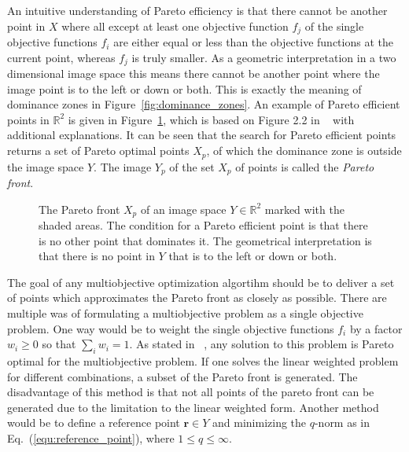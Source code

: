 \documentclass[a4paper,10pt]{article}
\renewcommand{\vec}[1]{\mathbf{#1}}
\newcommand{\equref}[1]{Eq.~(\ref{#1})}
\newcommand{\figref}[1]{Figure~\ref{#1}}
\begin{document}
    An intuitive understanding of Pareto efficiency is that there cannot be another
    point in $X$ where all except at least one objective function $f_j$ of the single objective
    functions $f_i$ are either equal or less than the objective functions at the current point,
    whereas $f_j$ is truly smaller.
    As a geometric interpretation in a two dimensional image space this means
    there cannot be another point where the image point is to the left or down or both.
    This is exactly the meaning of dominance zones in \figref{fig:dominance_zones}.
    An example of Pareto efficient points in $\mathbb{R}^2$ is given in \figref{fig:pareto_front},
    which is based on Figure 2.2 in ~\cite{multiobjective} with additional explanations.
    It can be seen that the search for Pareto efficient points returns a
    set of Pareto optimal points $X_p$, of which the dominance zone is outside the
    image space $Y$.
    The image $Y_p$ of the set $X_p$ of points is called the \emph{Pareto front}.
    
    \begin{figure}
        \centering
        \caption[Pareto front]{The Pareto front $X_p$ of an image space $Y \in \mathbb{R}^2$
        marked with the shaded areas.
        The condition for a Pareto efficient point is that there is no other
        point that dominates it.
        The geometrical interpretation is that there is no point in $Y$ that
        is to the left or down or both.}
        \label{fig:pareto_front}
    \end{figure}
    
    The goal of any multiobjective optimization algortihm should be to deliver
    a set of points which approximates the Pareto front as closely as possible.
    There are multiple was of formulating a multiobjective problem as
    a single objective problem.
    One way would be to weight the single objective functions $f_i$ by a factor
    $w_i \geq 0$ so that $\sum_i w_i = 1$.
    As stated in ~\cite{multiobjective}, any solution to this problem is Pareto
    optimal for the multiobjective problem.
    If one solves the linear weighted problem for different combinations,
    a subset of the Pareto front is generated.
    The disadvantage of this method is that not all points of the pareto front
    can be generated due to the limitation to the linear weighted form.
    Another method would be to define a reference point $\vec{r} \in Y$ and
    minimizing the $q$-norm as in \equref{equ:reference_point}, where
    $1 \leq q \leq \infty$.
\end{document}
